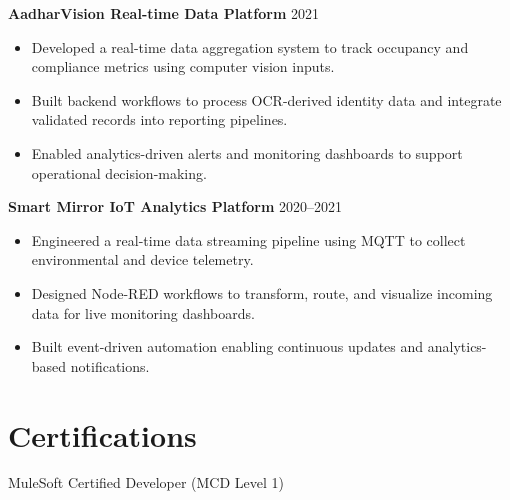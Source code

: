 \documentclass[letterpaper,11pt]{article}
\begin{document}
\textbf{AadharVision Real-time Data Platform} \hfill 2021
\begin{itemize}
\item Developed a real-time data aggregation system to track occupancy and compliance metrics using computer vision inputs.
\item Built backend workflows to process OCR-derived identity data and integrate validated records into reporting pipelines.
\item Enabled analytics-driven alerts and monitoring dashboards to support operational decision-making.
\end{itemize}

\textbf{Smart Mirror IoT Analytics Platform} \hfill 2020--2021
\begin{itemize}
\item Engineered a real-time data streaming pipeline using MQTT to collect environmental and device telemetry.
\item Designed Node-RED workflows to transform, route, and visualize incoming data for live monitoring dashboards.
\item Built event-driven automation enabling continuous updates and analytics-based notifications.
\end{itemize}


\section*{Certifications}
MuleSoft Certified Developer (MCD Level 1)
\end{document}
